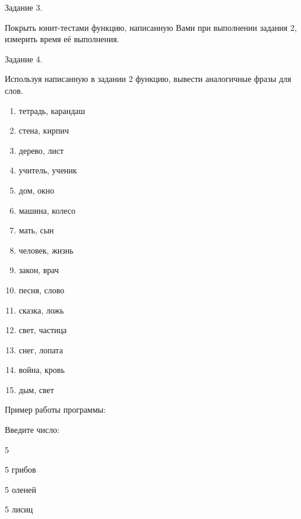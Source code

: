 Задание 3.

Покрыть юнит-тестами функцию, написанную Вами при выполнении задания 2, измерить время её выполнения.

Задание 4.

Используя написанную в задании 2 функцию, вывести аналогичные фразы для слов.

\begin{enumerate}

\item 	тетрадь, карандаш

\item 	стена, кирпич

\item 	дерево, лист

\item 	учитель, ученик

\item 	дом, окно

\item 	машина, колесо

\item 	мать, сын

\item 	человек, жизнь

\item 	закон, врач

\item 	песня, слово

\item 	сказка, ложь

\item 	 свет, частица

\item 	снег, лопата

\item 	война, кровь

\item 	дым, свет


\end{enumerate}

Пример работы программы:

Введите число:

5

5 грибов

5 оленей

5 лисиц  


